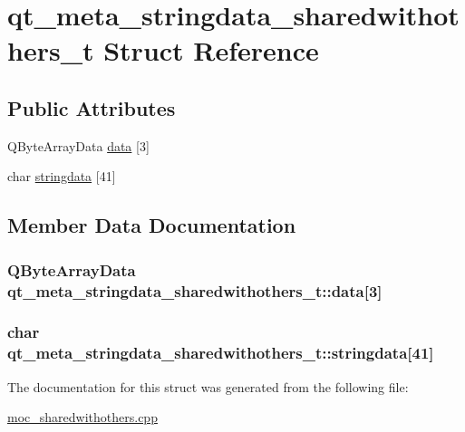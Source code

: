 \hypertarget{structqt__meta__stringdata__sharedwithothers__t}{\section{qt\-\_\-meta\-\_\-stringdata\-\_\-sharedwithothers\-\_\-t Struct Reference}
\label{structqt__meta__stringdata__sharedwithothers__t}
}
\subsection*{Public Attributes}
\begin{DoxyCompactItemize}
\item 
Q\-Byte\-Array\-Data \hyperlink{structqt__meta__stringdata__sharedwithothers__t_abd96e1d762781410f45c4b652c4a8689}{data} \mbox{[}3\mbox{]}
\item 
char \hyperlink{structqt__meta__stringdata__sharedwithothers__t_a3397bd7359b3639beee9ef4aa07886dd}{stringdata} \mbox{[}41\mbox{]}
\end{DoxyCompactItemize}


\subsection{Member Data Documentation}
\hypertarget{structqt__meta__stringdata__sharedwithothers__t_abd96e1d762781410f45c4b652c4a8689}{
\subsubsection[{data}]{\setlength{\rightskip}{0pt plus 5cm}Q\-Byte\-Array\-Data qt\-\_\-meta\-\_\-stringdata\-\_\-sharedwithothers\-\_\-t\-::data\mbox{[}3\mbox{]}}}\label{structqt__meta__stringdata__sharedwithothers__t_abd96e1d762781410f45c4b652c4a8689}
\hypertarget{structqt__meta__stringdata__sharedwithothers__t_a3397bd7359b3639beee9ef4aa07886dd}{
\subsubsection[{stringdata}]{\setlength{\rightskip}{0pt plus 5cm}char qt\-\_\-meta\-\_\-stringdata\-\_\-sharedwithothers\-\_\-t\-::stringdata\mbox{[}41\mbox{]}}}\label{structqt__meta__stringdata__sharedwithothers__t_a3397bd7359b3639beee9ef4aa07886dd}


The documentation for this struct was generated from the following file\-:\begin{DoxyCompactItemize}
\item 
\hyperlink{moc__sharedwithothers_8cpp}{moc\-\_\-sharedwithothers.\-cpp}\end{DoxyCompactItemize}
